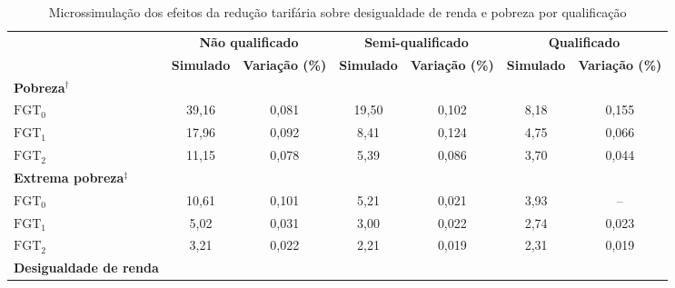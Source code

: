 \begin{table}[h]
	\centering
	\small
	\begin{adjustwidth}{-1.5cm}{}
	\begin{threeparttable}
		\caption{Microssimulação dos efeitos da redução tarifária sobre desigualdade de renda e pobreza por qualificação} \label{tab:result_microssimulacao}
	\begin{tabular}{lcccccc}
	\hline
	\multirow{4}{*}{\textbf{}} & \multicolumn{2}{c}{\multirow{2}{*}{\textbf{Não qualificado}}} & \multicolumn{2}{c}{\multirow{2}{*}{\textbf{Semi-qualificado}}} & \multicolumn{2}{c}{\multirow{2}{*}{\textbf{Qualificado}}} \\
	 & \multicolumn{2}{c}{} & \multicolumn{2}{c}{} & \multicolumn{2}{c}{} \\ \cline{2-7} 
	 & \multirow{2}{*}{\textbf{Simulado}} & \multirow{2}{*}{\textbf{Variação (\%)}} & \multirow{2}{*}{\textbf{Simulado}} & \multirow{2}{*}{\textbf{Variação (\%)}} & \multirow{2}{*}{\textbf{Simulado}} & \multirow{2}{*}{\textbf{Variação (\%)}} \\
	 &  &  &  &  &  &  \\ \hline
	\textbf{Pobreza$^{\dag}$}    		          &       &        &       &        &       &        \\[3pt]
	\hspace{0.2cm} $\text{FGT}_0$   		  	  & 39,16 & 0,081  & 19,50 & 0,102  & 8,18  & 0,155  \\[3pt]
	\hspace{0.2cm} $\text{FGT}_1$   	  		  & 17,96 & 0,092  & 8,41  & 0,124  & 4,75  & 0,066  \\[3pt]
	\hspace{0.2cm} $\text{FGT}_2$   	   		  & 11,15 & 0,078  & 5,39  & 0,086  & 3,70  & 0,044  \\[3pt] \hline
	\textbf{Extrema pobreza$^{\ddagger}$} &       &        &       &        &       &                \\[3pt]
	\hspace{0.2cm} $\text{FGT}_0$   			  & 10,61 & 0,101  & 5,21  & 0,021  & 3,93  & --     \\[3pt]
	\hspace{0.2cm} $\text{FGT}_1$   		  	  & 5,02  & 0,031  & 3,00  & 0,022  & 2,74  & 0,023  \\[3pt]
	\hspace{0.2cm} $\text{FGT}_2$       		  & 3,21  & 0,022  & 2,21  & 0,019  & 2,31  & 0,019  \\[3pt] \hline
	\textbf{Desigualdade de renda}                &       &        &       &        &       &        \\[3pt]

\end{tabular}
\end{threeparttable}
\end{adjustwidth}
\end{table}
